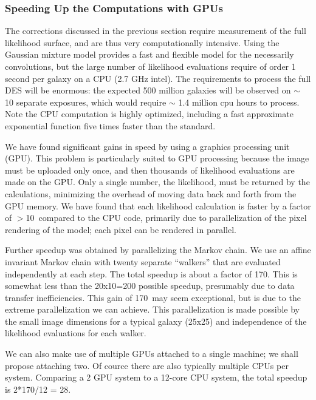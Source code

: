 \documentclass[12pt]{article}
\newcommand{\speedupnum}{10}
\newcommand{\overallspeedup}{170}
\begin{document}
\subsubsection{Speeding Up the Computations with GPUs} \label{sec:gmix:gpu}

The corrections discussed in the previous section require measurement of the
full likelihood surface, and are thus very computationally intensive.  Using
the Gaussian mixture model provides a fast and flexible model for the
necessarily convolutions, but the large number of likelihood evaluations
require of order 1 second per galaxy on a CPU (2.7 GHz intel). The requirements
to process the full DES will be enormous: the expected 500 million galaxies
will be observed on $\sim$ 10 separate exposures, which would require $\sim$
1.4 million cpu hours to process. Note the CPU computation is highly optimized,
including a fast approximate exponential function five times faster than the
standard. 

We have found significant gains in speed by using a graphics processing unit
(GPU).  This problem is particularly suited to GPU processing because the image
must be uploaded only once, and then thousands of likelihood evaluations are
made on the GPU. Only a single number, the likelihood, must be returned by the
calculations, minimizing the overhead of moving data back and forth from the
GPU memory.  We have found that each likelihood calculation is faster by a
factor of $>$\speedupnum\ compared to the CPU code, primarily due to
parallelization of the pixel rendering of the model; each pixel can be rendered
in parallel.

Further speedup was obtained by parallelizing the Markov chain.  We use an
affine invariant Markov chain\cite{GoodmanWeare10} with twenty separate
``walkers'' that are evaluated independently at each step.  The total speedup
is about a factor of \overallspeedup.  This is somewhat less than the 20x10=200
possible speedup, presumably due to data transfer inefficiencies.  This gain of
\overallspeedup\ may seem exceptional, but is due to the extreme
parallelization we can achieve.  This parallelization is made possible by the
small image dimensions for a typical galaxy (25x25) and independence of the
likelihood evaluations for each walker.

We can also make use of multiple GPUs attached to a single machine; we shall
propose attaching two.  Of cource there are also typically multiple CPUs per
system.  Comparing a 2 GPU system to a 12-core CPU system, the total speedup is
2*170/12 = 28.
\end{document}

